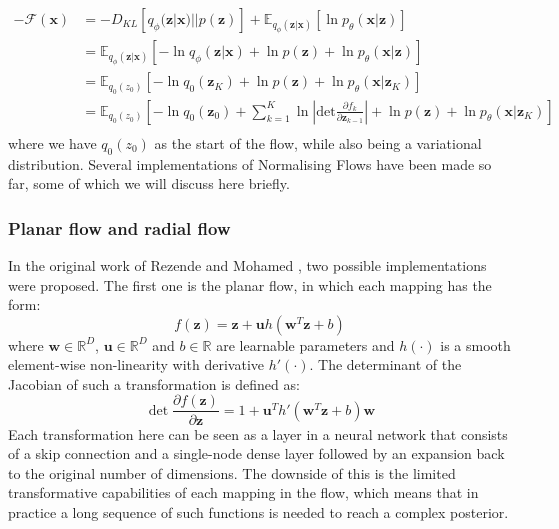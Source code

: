 \documentclass{report}
\newcommand{\E}{\mathbb{E}}
\newcommand{\R}{\mathbb{R}}
\newcommand{\bu}{\mathbf{u}}
\newcommand{\bw}{\mathbf{w}}
\newcommand{\bx}{\mathbf{x}}
\newcommand{\bz}{\mathbf{z}}
\newcommand{\parfrac}[2]{\frac{\partial #1}{\partial#2}}
\begin{document}
\begin{equation}\label{equation:negative_free_energy_with_flow}
    \begin{split}
    -\mathcal{F}(\bx) &= -D_{KL}[q_\phi(\bz|\bx) || p(\bz)] + \E_{q_\phi(\bz|\bx)}[\ln p_\theta(\bx|\bz)]\\
    &= \E_{q_\phi(\bz|\bx)}[-\ln q_\phi(\bz|\bx) + \ln p(\bz) + \ln p_\theta(\bx|\bz)]\\
    &= \E_{q_0(z_0)}[-\ln q_0(\bz_K) + \ln p(\bz) + \ln p_\theta(\bx|\bz_K)]\\
    &= \E_{q_0(z_0)}[-\ln q_0(\bz_0) + \sum\limits^K_{k=1}\ln \left|\text{det} \parfrac{f_k}{\bz_{k-1}} \right| + \ln p(\bz) + \ln p_\theta(\bx|\bz_K)]\\
    \end{split}
\end{equation}
where we have $q_0(z_0)$ as the start of the flow, while also being a variational distribution. Several implementations of Normalising Flows have been made so far, some of which we will discuss here briefly.

\subsubsection{Planar flow and radial flow}\label{section:planar_radial_flow}
In the original work of Rezende and Mohamed \cite{rezende2016variational}, two possible implementations were proposed. The first one is the planar flow, in which each mapping has the form:
\begin{equation}\label{equation:planar_flow}
    f(\bz) = \bz + \bu h(\bw^T\bz + b)
\end{equation}
where $\bw \in \R^D$, $\bu \in \R^D$ and $b \in \R$ are learnable parameters and $h(\cdot)$ is a smooth element-wise non-linearity with derivative $h'(\cdot)$. The determinant of the Jacobian of such a transformation is defined as:
\begin{equation}\label{equation:planar_flow_logdet}
    \det\parfrac{f(\bz)}{\bz}  = 1 + \bu^T h'(\bw^T \bz + b)\bw
\end{equation}
Each transformation here can be seen as a layer in a neural network that consists of a skip connection and a single-node dense layer followed by an expansion back to the original number of dimensions. The downside of this is the limited transformative capabilities of each mapping in the flow, which means that in practice a long sequence of such functions is needed to reach a complex posterior.
\end{document}
